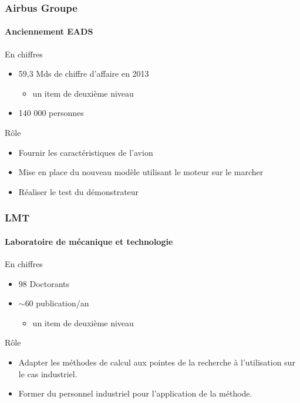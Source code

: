 \documentclass[12pt]{beamer}
\begin{document}
\begin{frame}

\frametitle{Airbus Groupe}
\framesubtitle{Anciennement EADS}

\begin{block}{En chiffres}
\begin{itemize}
  \item 59,3 Mds de chiffre d'affaire en 2013
  \begin{itemize}
     \item un item de deuxième niveau
  \end{itemize}
  \item 140 000 personnes
\end{itemize}
\end{block}
\begin{block}{Rôle}
\begin{itemize}
  \item Fournir les caractéristiques de l'avion
  \item Mise en place du nouveau modèle utilisant le moteur sur le marcher
  \item Réaliser le test du démonstrateur
\end{itemize}
\end{block}

\end{frame}

\begin{frame}

\frametitle{LMT}
\framesubtitle{Laboratoire de mécanique et technologie}

\begin{block}{En chiffres}
\begin{itemize}
  \item 98 Doctorants
  \item $\sim$60 publication/an
  \begin{itemize}
     \item un item de deuxième niveau
  \end{itemize}
\end{itemize}
\end{block}
\begin{block}{Rôle}
\begin{itemize}
  \item Adapter les méthodes de calcul aux pointes de la recherche à l'utilisation sur le cas industriel.
  \item Former du personnel industriel pour l'application de la méthode.
\end{itemize}
\end{block}
\end{frame}


\end{document}
